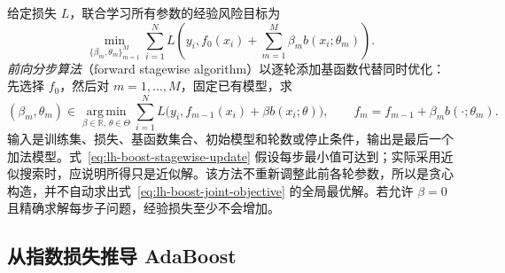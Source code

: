 给定损失 $L$，联合学习所有参数的经验风险目标为
\begin{equation}
 \min_{\{\beta_m,\theta_m\}_{m=1}^{M}}
 \sum_{i=1}^{N}L\left(y_i,f_0(x_i)+\sum_{m=1}^{M}\beta_mb(x_i;\theta_m)\right).
 \label{eq:lh-boost-joint-objective}
\end{equation}
\emph{前向分步算法}（forward stagewise algorithm）以逐轮添加基函数代替同时优化：先选择 $f_0$，然后对 $m=1,\ldots,M$，固定已有模型，求
\begin{equation}
 (\beta_m,\theta_m)\in\operatorname*{arg\,min}_{\beta\in\mathbb R,\,\theta\in\Theta}
 \sum_{i=1}^{N}L\bigl(y_i,f_{m-1}(x_i)+\beta b(x_i;\theta)\bigr),\qquad
 f_m=f_{m-1}+\beta_mb(\cdot;\theta_m).
 \label{eq:lh-boost-stagewise-update}
\end{equation}
输入是训练集、损失、基函数集合、初始模型和轮数或停止条件，输出是最后一个加法模型。式~\eqref{eq:lh-boost-stagewise-update} 假设每步最小值可达到；实际采用近似搜索时，应说明所得只是近似解。该方法不重新调整此前各轮参数，所以是贪心构造，并不自动求出式~\eqref{eq:lh-boost-joint-objective} 的全局最优解。若允许 $\beta=0$ 且精确求解每步子问题，经验损失至少不会增加。

\subsection{从指数损失推导 AdaBoost}
\label{subsec:lh-boost-exponential}

